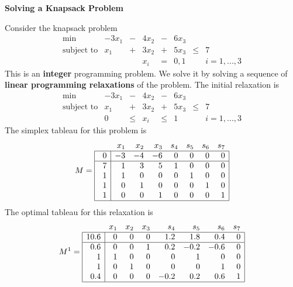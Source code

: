 


\begin{center}
  {\bf\large\bf Solving a Knapsack Problem}
\end{center}

Consider the knapsack problem
\begin{displaymath}
  \begin{array}{lrcrcrcl}
    \min & -3x_1 & - & 4x_2 & - & 6x_3 \\
   \mbox{subject to} & x_1 & + & 3x_2 & + & 5x_3 & \leq & 7 \\
         &&& x_i & = & 0,1 && i=1,...,3
  \end{array}
\end{displaymath}
This is an {\bf integer} programming problem.
We solve it by solving a sequence of {\bf linear programming relaxations} of
the problem.
The initial relaxation is
\begin{displaymath}
  \begin{array}{lrcrcrcl}
    \min & -3x_1 & - & 4x_2 & - & 6x_3 \\
   \mbox{subject to} & x_1 & + & 3x_2 & + & 5x_3 & \leq & 7 \\
         & 0 & \leq & x_i & \leq & 1 && i=1,...,3
  \end{array}
\end{displaymath}
The simplex tableau for this problem is
       \begin{displaymath}
         M =
         \begin{array}{|r|rrrrrrr|}
            \multicolumn{1}{c}{\quad} & x_1 & x_2 & x_3 & s_4 & s_5 & s_6 &
                \multicolumn{1}{c}{s_7} \\ \hline
             0 & -3 & -4 & -6 & 0 & 0 & 0 & 0 \\ \hline
             7 & 1 & 3 & 5 & 1 & 0 & 0 & 0 \\
             1 & 1 & 0 & 0 & 0 & 1 & 0 & 0 \\
             1 & 0 & 1 & 0 & 0 & 0 & 1 & 0 \\
             1 & 0 & 0 & 1 & 0 & 0 & 0 & 1 \\ \hline
         \end{array}
       \end{displaymath}
The optimal tableau for this relaxation is
       \begin{displaymath}
         M^1 =
         \begin{array}{|r|rrrrrrr|}
            \multicolumn{1}{c}{\quad} & x_1 & x_2 & x_3 & s_4 & s_5 & s_6 &
                \multicolumn{1}{c}{s_7} \\ \hline
             10.6 & 0 & 0 & 0 & 1.2 & 1.8 & 0.4 & 0 \\ \hline
             0.6 & 0 & 0 & 1 & 0.2 & -0.2 & -0.6 & 0 \\
             1 & 1 & 0 & 0 & 0 & 1 & 0 & 0 \\
             1 & 0 & 1 & 0 & 0 & 0 & 1 & 0 \\
             0.4 & 0 & 0 & 0 & -0.2 & 0.2 & 0.6 & 1 \\ \hline
         \end{array}
       \end{displaymath}
